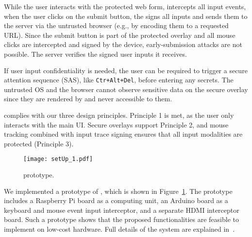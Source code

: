 While the user interacts with the protected web form, \hub intercepts all input events, when the user clicks on the submit button, the \hub signs all inputs and sends them to the server via the untrusted browser (e.g., by encoding them to a requested URL). Since the submit button is part of the protected overlay and all mouse clicks are intercepted and signed by the \hub device, early-submission attacks are not possible. The server verifies the signed user inputs it receives. 

If user input confidentiality is needed, the user can be required to trigger a secure attention sequence (SAS), like \texttt{Ctr+Alt+Del}, before entering any secrets. The untrusted OS and the browser cannot observe sensitive data on the secure overlay since they are rendered by \hub and never accessible to them.

\protection complies with our three design principles. Principle 1 is met, as the user only interacts with the main UI. Secure overlays support Principle 2, and mouse tracking combined with input trace signing ensures that all input modalities are protected (Principle 3).

\begin{figure}[t]
    \centering
    \texttt{[image: setUp\_1.pdf]}
    \caption{\protection prototype.}
\label{fig:prototype}   
\end{figure}

We implemented a prototype of \protection, which is shown in Figure~\ref{fig:prototype}. The prototype includes a Raspberry Pi board as a computing unit, an Arduino board as a keyboard and mouse event input interceptor, and a separate HDMI interceptor board. Such a prototype shows that the proposed functionalities are feasible to implement on low-cost hardware. Full details of the \protection system are explained in~\cite{protection}.

